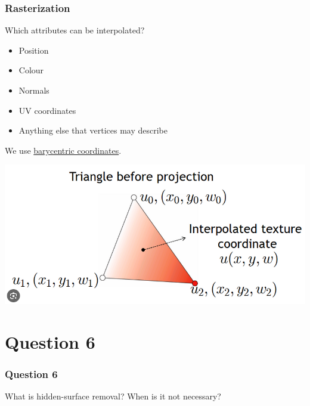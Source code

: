 \documentclass{beamer}
\begin{document}
\begin{frame}
    \frametitle{Rasterization}

    Which attributes can be interpolated?
    \begin{itemize}
        \item Position
        \item Colour
        \item Normals
        \item UV coordinates
        \item Anything else that vertices may describe
    \end{itemize}

    We use \hyperlink{https://www.scratchapixel.com/lessons/3d-basic-rendering/ray-tracing-rendering-a-triangle/barycentric-coordinates.html}{barycentric coordinates}.

    \begin{center}
        \includegraphics[scale=0.4]{q6-bary.png}
    \end{center}

\end{frame}

\section{Question 6}

\begin{frame}
    \frametitle{Question 6}
    What is hidden-surface removal? When is it not necessary?
\end{frame}
\end{document}
